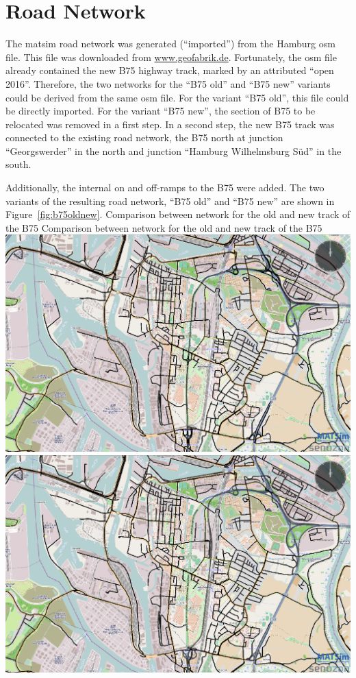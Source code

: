 \section{Road Network}
The \gls{matsim} road network was generated (``imported'') from the Hamburg \gls{osm} file. This file was downloaded from \url{www.geofabrik.de}. Fortunately, the \gls{osm} file already contained the new B75 highway track, marked by an attributed ``open 2016''. Therefore, the two networks for the ``B75 old'' and ``B75 new''  variants could be derived from the same \gls{osm} file. For the variant ``B75 old'', this file could be directly imported. For the variant ``B75 new'', the section of B75 to be relocated was removed in a first step. In a second step, the new B75 track was connected to the existing road network, \ie the B75 north at junction ``Georgswerder'' in the north and junction ``Hamburg Wilhelmsburg Süd'' in the south.

Additionally, the internal on and off-ramps to the B75 were added. The two variants of the resulting road network, \ie ``B75 old'' and ``B75 new'' are shown in Figure~\ref{fig:b75oldnew}.
%
\createfigure%
{Comparison between network for the old and new track of the B75}%
{Comparison between network for the old and new track of the B75}%
{\label{fig:b75oldnew}}%
{%
  \createsubfigure%
  {}%
  {\includegraphics[width=.475\linewidth]{scenarios/figures/B75old}}%
  {}%
  {}%
  \createsubfigure%
  {}%
  {\includegraphics[width=.475\linewidth]{scenarios/figures/B75new}}
  {}%
  {}%
}%
  {}%

